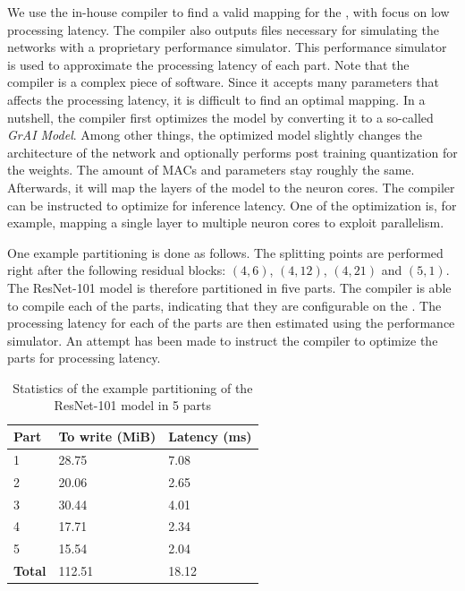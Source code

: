 We use the in-house compiler to find a valid mapping for the \graicore{}, with focus on low processing latency.
The compiler also outputs files necessary for simulating the networks with a proprietary performance simulator.
This performance simulator is used to approximate the processing latency of each part.
Note that the compiler is a complex piece of software.
Since it accepts many parameters that affects the processing latency, it is difficult to find an optimal mapping. 
In a nutshell, the compiler first optimizes the model by converting it to a so-called \textit{GrAI Model}.
Among other things, the optimized model slightly changes the architecture of the network and optionally performs post training quantization \autocite{krishnamoorthiQuantizingDeepConvolutional2018} for the weights.
The amount of MACs and parameters stay roughly the same.
Afterwards, it will map the layers of the model to the neuron cores.
The compiler can be instructed to optimize for inference latency.
One of the optimization is, for example, mapping a single layer to multiple neuron cores to exploit parallelism.

One example partitioning is done as follows.
The splitting points are performed right after the following residual blocks: $(4, 6)$, $(4, 12)$, $(4,21)$ and $(5,1)$.
The ResNet-101 model is therefore partitioned in five parts.
The compiler is able to compile each of the parts, indicating that they are configurable on the \graicore{}.
The processing latency for each of the parts are then estimated using the performance simulator.
An attempt has been made to instruct the compiler to optimize the parts for processing latency.

\begin{table}[hbtp]
\centering
\begin{tabular}{@{}lll@{}}
\toprule
\textbf{Part}  & \textbf{To write (MiB)} & \textbf{Latency (ms)} \\ \midrule
1              & 28.75                   & 7.08                  \\
2              & 20.06                   & 2.65                  \\
3              & 30.44                   & 4.01                  \\
4              & 17.71                   & 2.34                  \\
5              & 15.54                   & 2.04                  \\ \midrule
\textbf{Total} & 112.51                  & 18.12                 \\ \bottomrule
\end{tabular}
\caption{Statistics of the example partitioning of the ResNet-101 model in 5 parts}
\label{tab:resnet101_5parts}
\end{table}

